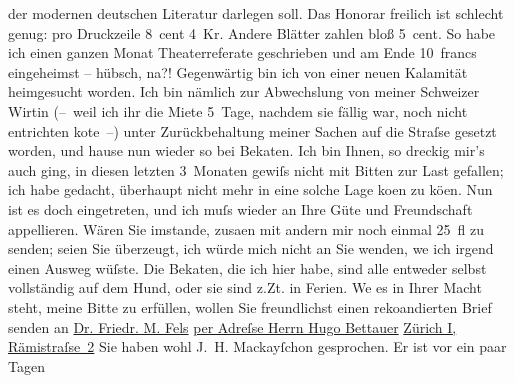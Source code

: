 \begin{ledgroupsized}[t]{13cm}
                    der modernen deutschen Literatur darlegen soll. Das Honorar freilich ist
                    schlecht genug: pro Druckzeile 8 cent 4 Kr. Andere Blätter zahlen bloß 5 cent.
                    So habe ich einen ganzen Monat Theaterreferate geschrieben und am Ende 10 francs
                    eingeheimst – hübsch, na?!\pend
           \pstart
           {\pb}Gegenwärtig bin ich von einer neuen Kalamität
                    heimgesucht worden. Ich bin nämlich zur Abwechslung von meiner Schweizer Wirtin (– weil ich ihr die Miete 5 Tage, nachdem sie fällig war, noch
                    nicht entrichten ko{\geminationn}te –) unter Zurückbehaltung
                    meiner Sachen auf die Straſse gesetzt worden, und hause nun wieder so bei Beka{\geminationn}ten. Ich bin Ihnen, so dreckig mir’s auch ging,
                    in diesen letzten 3 Monaten gewiſs nicht mit Bitten zur Last gefallen; ich habe
                    gedacht, überhaupt nicht mehr in eine solche Lage ko{\geminationm}en zu kö{\geminationn}en. Nun ist es doch eingetreten, und ich
                    muſs wieder an Ihre Güte und Freundschaft appellieren. Wären Sie imstande,
                        zusa{\geminationm}en mit andern mir noch einmal 25 fl zu
                    senden; seien Sie überzeugt, ich würde mich nicht an Sie wenden, we{\geminationn} ich irgend einen Ausweg wüſste. Die Beka{\geminationn}ten, die ich hier habe, sind alle entweder selbst
                    vollständig auf dem Hund, oder sie sind z.Zt. in Ferien. We{\geminationn} es in Ihrer Macht steht, meine Bitte zu
                    erfüllen, wollen Sie freundlichst einen reko{\geminationm}andierten Brief senden an\pend
           \pstart
           \centering{}\uline{Dr. Friedr. M. Fels}\pend
           \pstart
           \noindent{}\centering{}\uline{per Adreſse Herrn Hugo
                            Bettauer}\pend
           \pstart
           \noindent{}\raggedleft{}\uline{Zürich I, Rämistraſse 2}\pend
           \pstart
           \noindent{}{\pb}Sie haben wohl J. H. Mackayſchon gesprochen. Er ist vor ein paar Tagen

\end{ledgroupsized}
